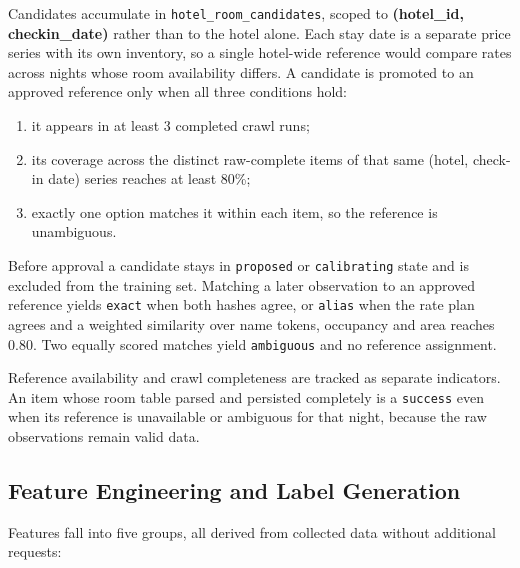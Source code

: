 Candidates accumulate in \texttt{hotel\_room\_candidates}, scoped to \textbf{(hotel\_id, checkin\_date)} rather than to the hotel alone. Each stay date is a separate price series with its own inventory, so a single hotel-wide reference would compare rates across nights whose room availability differs. A candidate is promoted to an approved reference only when all three conditions hold:

\begin{enumerate}[leftmargin=*]
    \item it appears in at least 3 completed crawl runs;
    \item its coverage across the distinct raw-complete items of that same (hotel, check-in date) series reaches at least 80\%;
    \item exactly one option matches it within each item, so the reference is unambiguous.
\end{enumerate}

Before approval a candidate stays in \texttt{proposed} or \texttt{calibrating} state and is excluded from the training set. Matching a later observation to an approved reference yields \texttt{exact} when both hashes agree, or \texttt{alias} when the rate plan agrees and a weighted similarity over name tokens, occupancy and area reaches 0.80. Two equally scored matches yield \texttt{ambiguous} and no reference assignment.

Reference availability and crawl completeness are tracked as separate indicators. An item whose room table parsed and persisted completely is a \texttt{success} even when its reference is unavailable or ambiguous for that night, because the raw observations remain valid data.

\subsection{Feature Engineering and Label Generation}

Features fall into five groups, all derived from collected data without additional requests:

